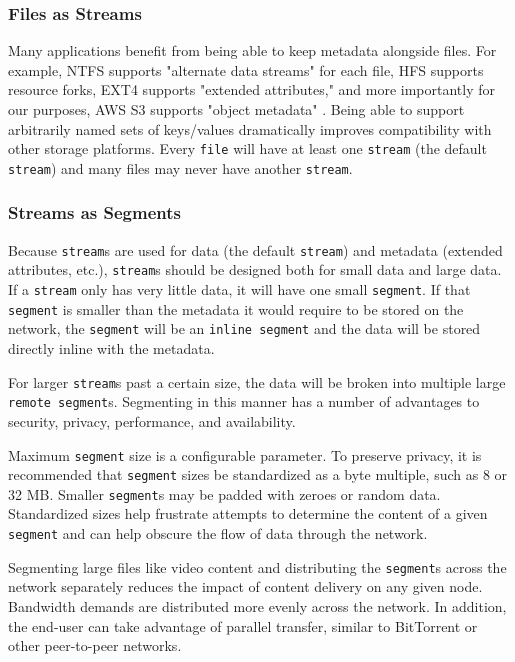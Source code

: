 \documentclass[a4paper,10pt]{article} \usepackage[utf8]{inputenc}
\newcommand{\x}[1]{{\tt #1}} \newcommand{\code}[1]{{\tt #1}}
\begin{document}
\subsubsection{Files as Streams}

Many applications benefit from being able to keep metadata alongside files. For
example, NTFS supports "alternate data streams" for each file, HFS supports
resource forks, EXT4 supports "extended attributes," and more importantly for
our purposes, AWS S3 supports "object metadata" \cite{s3-object-meta}. Being
able to support arbitrarily named sets of keys/values dramatically improves
compatibility with other storage platforms. Every \x{file} will have at least
one
\x{stream} (the default \x{stream}) and many files may never have another
\x{stream}.

\subsubsection{Streams as Segments}

Because \x{stream}s are used for data (the default \x{stream}) and metadata
(extended attributes, etc.), \x{stream}s should be designed both for small data
and large data. If a \x{stream} only has very little data, it will have one
small \x{segment}. If that \x{segment} is smaller than the metadata it would
require to be stored on the network, the \x{segment} will be an \x{inline
segment} and the data will be stored directly inline with the metadata.

For larger \x{stream}s past a certain size, the data will be broken into
multiple large \x{remote segment}s. Segmenting in this manner has a number of
advantages to security, privacy, performance, and availability.

Maximum \x{segment} size is a configurable parameter. To preserve privacy, it is
recommended that \x{segment} sizes be standardized as a byte multiple, such as 8
or 32 MB. Smaller \x{segment}s may be padded with zeroes or random data.
Standardized sizes help frustrate attempts to determine the content of a given
\x{segment} and can help obscure the flow of data through the network.

Segmenting large files like video content and distributing the \x{segment}s
across the network separately reduces the impact of content delivery on any
given node. Bandwidth demands are distributed more evenly across the network. In
addition, the end-user can take advantage of parallel transfer, similar to
BitTorrent or other peer-to-peer networks.
\end{document}
